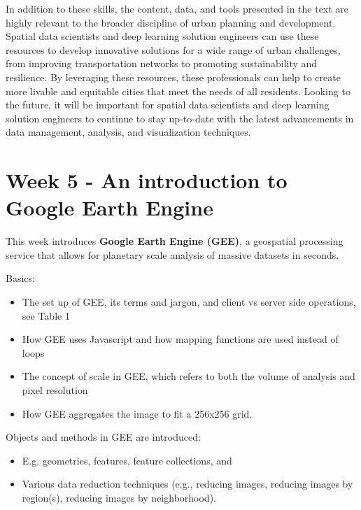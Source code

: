 \documentclass[
  letterpaper,
  DIV=11,
  numbers=noendperiod]{scrreprt}
\providecommand{\tightlist}{%
  \setlength{\itemsep}{0pt}\setlength{\parskip}{0pt}}\usepackage{longtable,booktabs,array}
\begin{document}
In addition to these skills, the content, data, and tools presented in
the text are highly relevant to the broader discipline of urban planning
and development. Spatial data scientists and deep learning solution
engineers can use these resources to develop innovative solutions for a
wide range of urban challenges, from improving transportation networks
to promoting sustainability and resilience. By leveraging these
resources, these professionals can help to create more livable and
equitable cities that meet the needs of all residents. Looking to the
future, it will be important for spatial data scientists and deep
learning solution engineers to continue to stay up-to-date with the
latest advancements in data management, analysis, and visualization
techniques.


\hypertarget{week-5---an-introduction-to-google-earth-engine}{%
\chapter{Week 5 - An introduction to Google Earth
Engine}\label{week-5---an-introduction-to-google-earth-engine}}

This week introduces \textbf{Google Earth Engine (GEE)}, a geospatial
processing service that allows for planetary scale analysis of massive
datasets in seconds.

Basics:

\begin{itemize}
\tightlist
\item
  The set up of GEE, its terms and jargon, and client vs server side
  operations, see Table 1
\item
  How GEE uses Javascript and how mapping functions are used instead of
  loops
\item
  The concept of scale in GEE, which refers to both the volume of
  analysis and pixel resolution
\item
  How GEE aggregates the image to fit a 256x256 grid.
\end{itemize}

Objects and methods in GEE are introduced:

\begin{itemize}
\tightlist
\item
  E.g. geometries, features, feature collections, and
\item
  Various data reduction techniques (e.g., reducing images, reducing
  images by region(s), reducing images by neighborhood).
\end{itemize}
\end{document}
